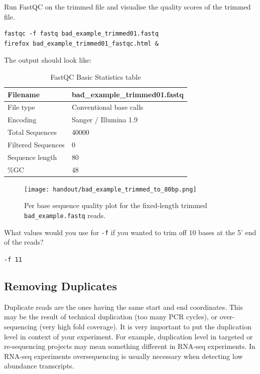 \begin{advanced}
\begin{steps}
Run FastQC on the trimmed file and visualise the quality scores of the trimmed file.
\begin{lstlisting}
fastqc -f fastq bad_example_trimmed01.fastq
firefox bad_example_trimmed01_fastqc.html &
\end{lstlisting}

The output should look like:

\begin{table}[H]
  \centering
  \caption{FastQC Basic Statistics table}
    \begin{tabular}{ll}
    \toprule
    Filename & bad\_example\_trimmed01.fastq\\
    \midrule
     File type & Conventional base calls\\
     Encoding & Sanger / Illumina 1.9\\
     Total Sequences & 40000\\
     Filtered Sequences & 0\\
     Sequence length & 80\\
    \%GC & 48\\
    \bottomrule
    \end{tabular}
  \label{tab:badexampletrimmed}
\end{table}

\begin{figure}[H]
\centering
\texttt{[image: handout/bad\_example\_trimmed\_to\_80bp.png]}
\caption{Per base sequence quality plot for the fixed-length trimmed \texttt{bad\_example.fastq} reads.}
\label{fig:bad_example_trimmed_plot}
\end{figure}

\end{steps}

\begin{questions}
What values would you use for \texttt{-f} if you wanted to trim off 10 bases at
the 5' end of the reads?
\begin{answer}
\texttt{-f 11}
\end{answer}
\end{questions}


\subsection{Removing Duplicates}
Duplicate reads are the ones having the same start and end coordinates. This
may be the result of technical duplication (too many PCR cycles), or
over-sequencing (very high fold coverage). It is very important to put the
duplication level in context of your experiment. For example, duplication level
in targeted or re-sequencing projects may mean something different in RNA-seq
experiments. In RNA-seq experiments oversequencing is usually necessary when
detecting low abundance transcripts.


\end{advanced}
